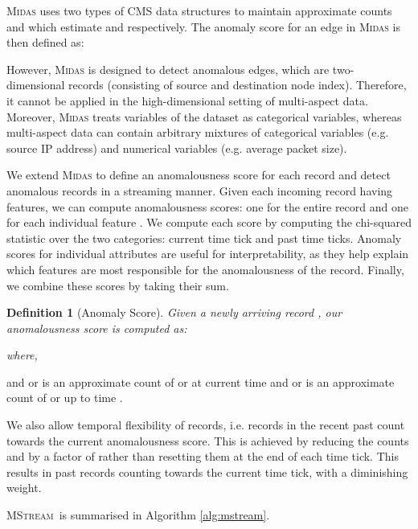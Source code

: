 \documentclass[sigconf]{acmart}
\newtheorem{definition}{Definition}
\newcommand{\method}{\textsc{MStream}}
\begin{document}
\textsc{Midas} uses two types of CMS data structures to maintain approximate counts  and  which estimate  and  respectively. The anomaly score for an edge in \textsc{Midas} is then defined as:



However, \textsc{Midas} is designed to detect anomalous edges, which are two-dimensional records (consisting of source and destination node index).
Therefore, it cannot be applied in the high-dimensional setting of multi-aspect data. Moreover, \textsc{Midas} treats variables of the dataset as categorical variables, whereas multi-aspect data can contain arbitrary mixtures of categorical variables (e.g. source IP address) and numerical variables (e.g. average packet size).

We extend \textsc{Midas} to define an anomalousness score for each record and detect anomalous records in a streaming manner. Given each incoming record  having  features, we can compute  anomalousness scores: one for the entire record  and one for each individual feature . We compute each score by computing the chi-squared statistic over the two categories: current time tick and past time ticks. Anomaly scores for individual attributes are useful for interpretability, as they help explain which features are most responsible for the anomalousness of the record.
Finally, we combine these scores by taking their sum.

\begin{definition}[Anomaly Score]
Given a newly arriving record , our anomalousness score is computed as:

where,

\end{definition}
and or  is an approximate count of  or  at current time  and or  is an approximate count of or  up to time .

We also allow temporal flexibility of records, i.e. records in the recent past count towards the current anomalousness score. This is achieved by reducing the counts  and  by a factor of  rather than resetting them at the end of each time tick. This results in past records counting towards the current time tick, with a diminishing weight.

\method\ is summarised in Algorithm \ref{alg:mstream}.
\end{document}
